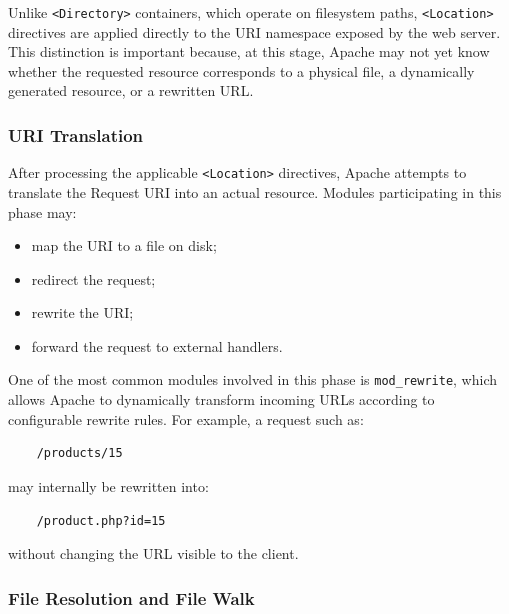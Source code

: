 \documentclass{scrbook}
\begin{document}
	Unlike \texttt{<Directory>} containers, which operate on filesystem paths, \texttt{<Location>} directives are applied directly to the URI namespace exposed by the web server. This distinction is important because, at this stage, Apache may not yet know whether the requested resource corresponds to a physical file, a dynamically generated resource, or a rewritten URL.
	
	\subsubsection{URI Translation}
	
	After processing the applicable \texttt{<Location>} directives, Apache attempts to translate the Request URI into an actual resource. Modules participating in this phase may:
	\begin{itemize}
		\item
		map the URI to a file on disk;
		
		\item
		redirect the request;
		
		\item
		rewrite the URI;
		
		\item
		forward the request to external handlers.
	\end{itemize}
	
	One of the most common modules involved in this phase is \texttt{mod\_rewrite}, which allows Apache to dynamically transform incoming URLs according to configurable rewrite rules. For example, a request such as:
	
	\begin{lstlisting}
	/products/15
	\end{lstlisting}
	
	may internally be rewritten into:
	
	\begin{lstlisting}
	/product.php?id=15
	\end{lstlisting}
	
	without changing the URL visible to the client.
	
	\subsubsection{File Resolution and File Walk}
	
\end{document}
